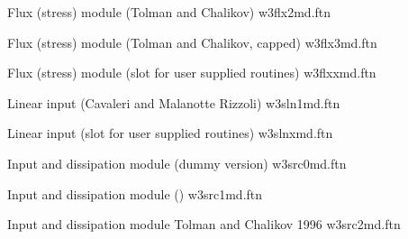 \noindent
Flux (stress) module (Tolman and Chalikov) \hfill {\file w3flx2md.ftn}

\begin{flisti}
\end{flisti}

\noindent
Flux (stress) module (Tolman and Chalikov, capped) \hfill {\file w3flx3md.ftn}

\begin{flisti}
\end{flisti}

\noindent
Flux (stress) module (slot for user supplied routines) \hfill {\file
w3flxxmd.ftn}

\begin{flisti}
\end{flisti}

\noindent
Linear input (Cavaleri and Malanotte Rizzoli) \hfill {\file w3sln1md.ftn}

\begin{flisti}
\end{flisti}

\pb \noindent
Linear input (slot for user supplied routines) \hfill {\file w3slnxmd.ftn}

\begin{flisti}
\end{flisti}

\noindent
Input and dissipation module (dummy version) \hfill {\file w3src0md.ftn}

\begin{flisti}
\end{flisti}

\noindent
Input and dissipation module () \hfill {\file w3src1md.ftn}

\begin{flisti}
\end{flisti}

\noindent
Input and dissipation module Tolman and Chalikov 1996 \hfill {\file w3src2md.ftn}

\begin{flisti}
\end{flisti}

